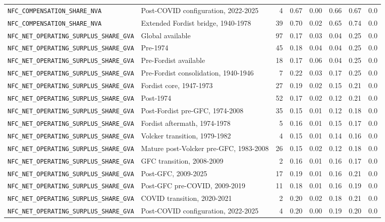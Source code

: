 \begin{landscape}
\begin{longtable}{p{4.4cm}p{3.8cm}rrrrrr}
\\
\nolinkurl{NFC_COMPENSATION_SHARE_NVA} & Post-COVID configuration, 2022-2025 & 4 & 0.67 & 0.00 & 0.66 & 0.67 & 0.0
\\
\nolinkurl{NFC_COMPENSATION_SHARE_NVA} & Extended Fordist bridge, 1940-1978 & 39 & 0.70 & 0.02 & 0.65 & 0.74 & 0.0
\\
\nolinkurl{NFC_NET_OPERATING_SURPLUS_SHARE_GVA} & Global available & 97 & 0.17 & 0.03 & 0.04 & 0.25 & 0.0
\\
\nolinkurl{NFC_NET_OPERATING_SURPLUS_SHARE_GVA} & Pre-1974 & 45 & 0.18 & 0.04 & 0.04 & 0.25 & 0.0
\\
\nolinkurl{NFC_NET_OPERATING_SURPLUS_SHARE_GVA} & Pre-Fordist available & 18 & 0.17 & 0.06 & 0.04 & 0.25 & 0.0
\\
\nolinkurl{NFC_NET_OPERATING_SURPLUS_SHARE_GVA} & Pre-Fordist consolidation, 1940-1946 & 7 & 0.22 & 0.03 & 0.17 & 0.25 & 0.0
\\
\nolinkurl{NFC_NET_OPERATING_SURPLUS_SHARE_GVA} & Fordist core, 1947-1973 & 27 & 0.19 & 0.02 & 0.15 & 0.21 & 0.0
\\
\nolinkurl{NFC_NET_OPERATING_SURPLUS_SHARE_GVA} & Post-1974 & 52 & 0.17 & 0.02 & 0.12 & 0.21 & 0.0
\\
\nolinkurl{NFC_NET_OPERATING_SURPLUS_SHARE_GVA} & Post-Fordist pre-GFC, 1974-2008 & 35 & 0.15 & 0.01 & 0.12 & 0.18 & 0.0
\\
\nolinkurl{NFC_NET_OPERATING_SURPLUS_SHARE_GVA} & Fordist aftermath, 1974-1978 & 5 & 0.16 & 0.01 & 0.15 & 0.17 & 0.0
\\
\nolinkurl{NFC_NET_OPERATING_SURPLUS_SHARE_GVA} & Volcker transition, 1979-1982 & 4 & 0.15 & 0.01 & 0.14 & 0.16 & 0.0
\\
\nolinkurl{NFC_NET_OPERATING_SURPLUS_SHARE_GVA} & Mature post-Volcker pre-GFC, 1983-2008 & 26 & 0.15 & 0.02 & 0.12 & 0.18 & 0.0
\\
\nolinkurl{NFC_NET_OPERATING_SURPLUS_SHARE_GVA} & GFC transition, 2008-2009 & 2 & 0.16 & 0.01 & 0.16 & 0.17 & 0.0
\\
\nolinkurl{NFC_NET_OPERATING_SURPLUS_SHARE_GVA} & Post-GFC, 2009-2025 & 17 & 0.19 & 0.01 & 0.16 & 0.21 & 0.0
\\
\nolinkurl{NFC_NET_OPERATING_SURPLUS_SHARE_GVA} & Post-GFC pre-COVID, 2009-2019 & 11 & 0.18 & 0.01 & 0.16 & 0.19 & 0.0
\\
\nolinkurl{NFC_NET_OPERATING_SURPLUS_SHARE_GVA} & COVID transition, 2020-2021 & 2 & 0.20 & 0.02 & 0.18 & 0.21 & 0.0
\\
\nolinkurl{NFC_NET_OPERATING_SURPLUS_SHARE_GVA} & Post-COVID configuration, 2022-2025 & 4 & 0.20 & 0.00 & 0.19 & 0.20 & 0.0

\end{longtable}
\end{landscape}
